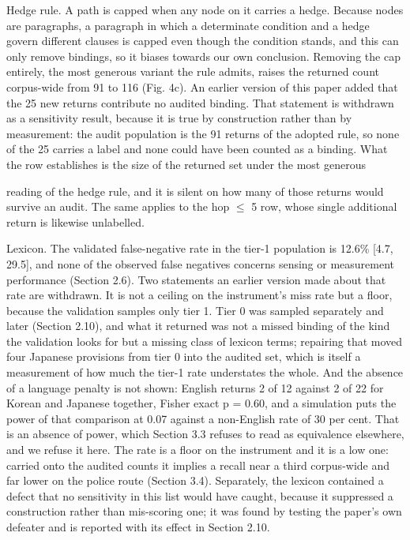 Hedge rule. A path is capped when any node on it carries a hedge. Because nodes are paragraphs, a paragraph in which a determinate condition and a hedge govern different clauses is capped even though the condition stands, and this can only remove bindings, so it biases towards our own conclusion. Removing the cap entirely, the most generous variant the rule admits, raises the returned count corpus-wide from 91 to 116 (Fig. 4c). An earlier version of this paper added that the 25 new returns contribute no audited binding. That statement is withdrawn as a sensitivity result, because it is true by construction rather than by measurement: the audit population is the 91 returns of the adopted rule, so none of the 25 carries a label and none could have been counted as a binding. What the row establishes is the size of the returned set under the most generous

reading of the hedge rule, and it is silent on how many of those returns would survive an audit. The same applies to the hop $\le$ 5 row, whose single additional return is likewise unlabelled.

Lexicon. The validated false-negative rate in the tier-1 population is 12.6\% [4.7, 29.5], and none of the observed false negatives concerns sensing or measurement performance (Section 2.6). Two statements an earlier version made about that rate are withdrawn. It is not a ceiling on the instrument's miss rate but a floor, because the validation samples only tier 1. Tier 0 was sampled separately and later (Section 2.10), and what it returned was not a missed binding of the kind the validation looks for but a missing class of lexicon terms; repairing that moved four Japanese provisions from tier 0 into the audited set, which is itself a measurement of how much the tier-1 rate understates the whole. And the absence of a language penalty is not shown: English returns 2 of 12 against 2 of 22 for Korean and Japanese together, Fisher exact p = 0.60, and a simulation puts the power of that comparison at 0.07 against a non-English rate of 30 per cent. That is an absence of power, which Section 3.3 refuses to read as equivalence elsewhere, and we refuse it here. The rate is a floor on the instrument and it is a low one: carried onto the audited counts it implies a recall near a third corpus-wide and far lower on the police route (Section 3.4). Separately, the lexicon contained a defect that no sensitivity in this list would have caught, because it suppressed a construction rather than mis-scoring one; it was found by testing the paper's own defeater and is reported with its effect in Section 2.10.

